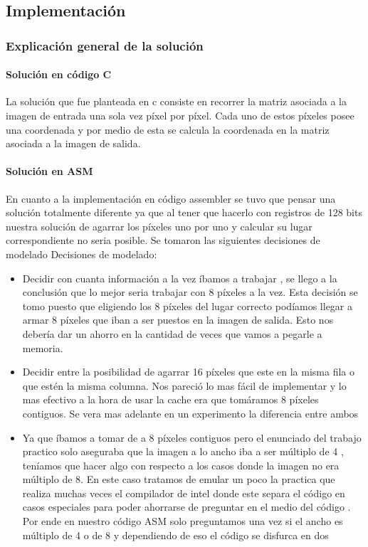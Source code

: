 \subsection{Implementación}
\subsubsection*{Explicación general de la solución}
\paragraph{Solución en código C}
La solución que fue planteada en c consiste en recorrer la matriz asociada a la imagen de entrada una sola vez píxel por píxel. Cada uno de estos píxeles posee una coordenada y por medio de esta se calcula la coordenada en la matriz asociada a la imagen de salida. 


\paragraph{Solución en ASM}
En cuanto a la implementación en código assembler se tuvo que pensar una solución totalmente diferente ya que al tener que hacerlo con registros de 128 bits nuestra solución de agarrar los píxeles uno por uno y calcular su lugar correspondiente no seria posible. Se tomaron las siguientes decisiones de modelado Decisiones de modelado:
\begin{itemize}
\item Decidir con cuanta información a la vez íbamos a trabajar , se llego a la conclusión que lo mejor seria trabajar con 8 píxeles a la vez. Esta decisión se tomo puesto que eligiendo los 8 píxeles del lugar correcto podíamos llegar a armar 8 píxeles que iban a ser puestos en la imagen de salida. Esto nos debería dar un ahorro en la cantidad de veces que vamos a pegarle a memoria.
\item Decidir entre la posibilidad de agarrar 16 píxeles que este en la misma fila o que estén la misma columna. Nos pareció lo mas fácil de implementar y lo mas efectivo a la hora de usar la cache era que tomáramos 8 píxeles contiguos. Se vera mas adelante en un experimento la diferencia entre ambos
\item Ya que íbamos a tomar de a 8 píxeles contiguos pero el enunciado del trabajo practico solo aseguraba que la imagen a lo ancho iba a ser múltiplo de 4 , teníamos que hacer algo con respecto a los casos donde la imagen no era múltiplo de 8. En este caso tratamos de emular un poco la practica que realiza muchas veces el compilador de intel donde este separa el código en casos especiales para poder ahorrarse de preguntar en el medio del código . Por ende en nuestro código ASM solo preguntamos una vez si el ancho es múltiplo de 4 o de 8 y dependiendo de eso el código se disfurca en dos
\end{itemize}

